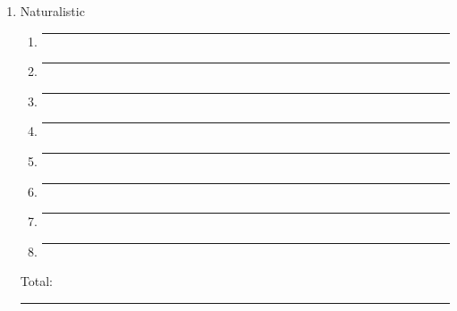 \documentclass[letterpaper, 11pt]{article}
\begin{document}
\begin{enumerate}
\item Naturalistic
	\begin{enumerate}
	\item \rule{.5in}{.01in} 
	\item \rule{.5in}{.01in} 
	\item \rule{.5in}{.01in} 
	\item \rule{.5in}{.01in} 
	\item \rule{.5in}{.01in} 
	\item \rule{.5in}{.01in} 
	\item \rule{.5in}{.01in} 
	\item \rule{.5in}{.01in} 
\end{enumerate}
Total:  \rule{.5in}{.01in}


	
\end{enumerate}
 
\end{document}
